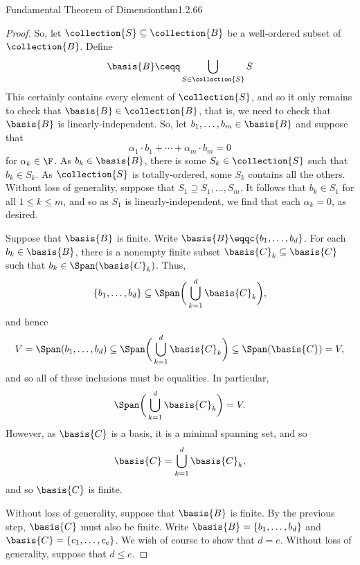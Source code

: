 \begin{thm}{Fundamental Theorem of Dimension}{thm1.2.66}
\begin{proof}
		So, let $\collection{S}\subseteq \collection{B}$ be a well-ordered subset of $\collection{B}$.  Define
		\begin{equation}
			\basis{B}\ceqq \bigcup _{S\in \collection{S}}S
		\end{equation}
		This certainly contains every element of $\collection{S}$, and so it only remains to check that $\basis{B}\in \collection{B}$, that is, we need to check that $\basis{B}$ is linearly-independent.  So, let $b_1,\ldots ,b_m\in \basis{B}$ and suppose that
		\begin{equation}
			\alpha _1\cdot b_1+\cdots +\alpha _m\cdot b_m=0
		\end{equation}
		for $\alpha _k\in \F$.  As $b_k\in \basis{B}$, there is some $S_k\in \collection{S}$ such that $b_k\in S_k$.  As $\collection{S}$ is totally-ordered, some $S_k$ contains all the others.  Without loss of generality, suppose that $S_1\supseteq S_1,\ldots ,S_m$.  It follows that $b_k\in S_1$ for all $1\leq k\leq m$, and so as $S_1$ is linearly-independent, we find that each $\alpha _k=0$, as desired.
		
		Suppose that $\basis{B}$ is finite.  Write $\basis{B}\eqqc \{ b_1,\ldots ,b_d\}$.  For each $b_k\in \basis{B}$, there is a nonempty finite subset $\basis{C}_k\subseteq \basis{C}$ such that $b_k\in \Span (\basis{C}_k)$.  Thus,
		\begin{equation}
			\{ b_1,\ldots ,b_d\} \subseteq \Span \bigg( \bigcup _{k=1}^d\basis{C}_k\bigg) ,
		\end{equation}
		and hence
		\begin{equation}
			V=\Span (b_1,\ldots ,b_d)\subseteq \Span \bigg( \bigcup _{k=1}^d\basis{C}_k\bigg) \subseteq \Span (\basis{C})=V,
		\end{equation}
		and so all of these inclusions must be equalities.  In particular,
		\begin{equation}
			\Span \bigg( \bigcup _{k=1}^d\basis{C}_k\bigg) =V.
		\end{equation}
		However, as $\basis{C}$ is a basis, it is a minimal spanning set, and so
		\begin{equation}
			\basis{C}=\bigcup _{k=1}^d\basis{C}_k,
		\end{equation}
		and so $\basis{C}$ is finite.
		
		Without loss of generality, suppose that $\basis{B}$ is finite.  By the previous step, $\basis{C}$ must also be finite.  Write $\basis{B}=\{ b_1,\ldots ,b_d\}$ and $\basis{C}=\{ c_1,\ldots ,c_e\}$.  We wish of course to show that $d=e$.  Without loss of generality, suppose that $d\leq e$.
		

\end{proof}
\end{thm}
